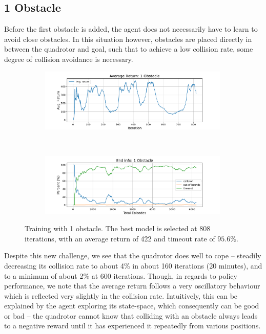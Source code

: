 \subsection{1 Obstacle}
\label{subsec:7_1_obstacle}
Before the first obstacle is added, the agent does not necessarily have to learn to avoid close obstacles. In this situation however, obstacles are placed directly in between the quadrotor and goal, such that to achieve a low collision rate, some degree of collision avoidance is necessary.
\begin{figure}[htb]
    \centering
    \begin{subfigure}[b]{\textwidth}
        \centering
        \captionsetup{justification=centering}
        \includegraphics[width=0.99\textwidth]{figures/7_/3DCarModel_BodyObs_NavSetup_1_NewObs_v1_reward.pdf}
        \label{fig:1_obst_nav_rew}
    \end{subfigure} \\
    \begin{subfigure}[b]{\textwidth}
        \centering
        \captionsetup{justification=centering}
        \includegraphics[width=0.99\textwidth]{figures/7_/3DCarModel_BodyObs_NavSetup_1_NewObs_v1_end_info.pdf}
        \label{fig:1_obst_nav_end}
    \end{subfigure} 
    \caption{Training with 1 obstacle. The best model is selected at 808 iterations, with an average return of 422 and timeout rate of $95.6\%$.}
    \label{fig:7_train_nav_1_obst}
\end{figure}
Despite this new challenge, we see that the quadrotor does well to cope -- steadily decreasing its collision rate to about 4\% in about 160 iterations (20 minutes), and to a minimum of about 2\% at 600 iterations. Though, in regards to policy performance, we note that the average return follows a very oscillatory behaviour which is reflected very slightly in the collision rate. Intuitively, this can be explained by the agent exploring its state-space, which consequently can be good or bad -- the quadrotor cannot know that colliding with an obstacle always leads to a negative reward until it has experienced it repeatedly from various positions. 

